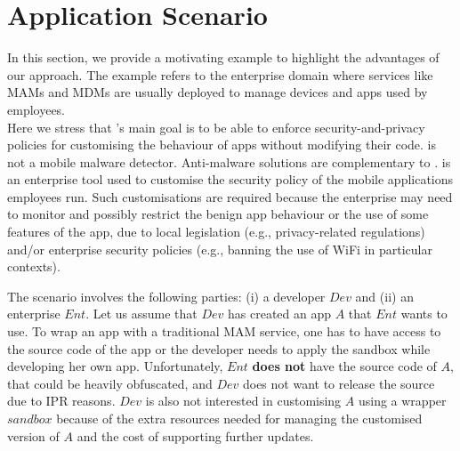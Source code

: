 \section{Application Scenario} \label{sec:app-scenario}

In this section, we provide a motivating example to highlight the advantages of our approach. The example refers to the enterprise domain where services like MAMs and MDMs are usually deployed to manage devices and apps used by employees.  \\

Here we stress that \asd's main goal is to be able to enforce security-and-privacy policies for customising the behaviour of  apps without modifying their code. 
\asd is not a mobile malware detector. Anti-malware solutions are complementary to \asd. \asd is an enterprise tool used to customise the security policy of the mobile applications employees run.
Such customisations are required because the enterprise may need to monitor and possibly restrict the benign app behaviour or the use of some features of the app, due to local legislation (e.g., privacy-related regulations) and/or enterprise security policies (e.g., banning the use of WiFi in particular contexts). 

\iffalse
\begin{figure*}[b]
\centering
\subfigure[app distribution model]{
\centering
\texttt{[image: 1]}
\label{fig:before}
}
~%
\subfigure[\asd distribution model]{
\centering
\texttt{[image: system\_model\_after]}
\label{fig:after}
}
\caption{App distribution: (a) default scenario , (b) \asd in place}
\label{fig:appdistribution}
\end{figure*}
\fi

The scenario involves the following parties: (i) a developer $Dev$ and (ii) an enterprise $Ent$.
Let us assume that $Dev$ has created an app $A$ that $Ent$ wants to use. 
To wrap an app with a traditional MAM service, one has to have access to the source code of the app or the developer needs to apply the sandbox while developing her own app.
Unfortunately, $Ent$ \textbf{does not} have the source code of $A$, that could be heavily obfuscated, and $Dev$ does not want to release the source due to IPR reasons. $Dev$ is also not interested in customising $A$ using a wrapper $sandbox$  because of the extra resources needed for managing the customised version of $A$ and the cost of supporting further updates. 

